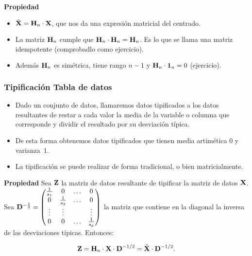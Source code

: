 \begin{frame}
\textbf{Propiedad}
\begin{itemize}
\item $\tilde{\mathbf{X}}=\mathbf{H}_n\cdot \mathbf{X}$, que nos da una expresión matricial del centrado.
\item La matriz $\mathbf{H}_n$ cumple que $\mathbf{H}_n\cdot \mathbf{H}_n = \mathbf{H}_n$.  Es lo que se llama una matriz idempotente (comprobadlo como ejercicio).
\item  Además $\mathbf{H}_n$ es simétrica, tiene rango $n-1$ y $\mathbf{H}_n \cdot \mathbf{1}_n=0$ (ejercicio).
\end{itemize}
\end{frame}
\begin{frame}
\frametitle{Tipificación Tabla de datos}
\begin{itemize}
\item Dado un conjunto de datos, llamaremos datos tipificados  a los datos resultantes de restar a cada valor la media de la variable o columna que corresponde y dividir el resultado por su desviación típica. 
\item De esta forma obtenemos datos tipificados que tienen media artimética $0$ y varianza~$1$.
\item La tipificación se puede realizar de forma tradicional, o bien matricialmente. 
\end{itemize}
\end{frame}

\begin{frame}
\textbf{Propiedad}
Sea $\mathbf{Z}$ la matriz de datos resultante de tipificar la matriz de datos $\mathbf{X}$. Sea 
$
\mathbf{D}^{-\frac{1}{2}}=
\begin{pmatrix} 
\frac{1}{s_1} & 0 & \ldots & 0\\
 0 & \frac{1}{s_2}  & \ldots & 0\\
 \vdots & \vdots & & \vdots\\
 0 & 0 & \ldots  & \frac{1}{s_p}
\end{pmatrix}
$
la matriz que contiene en la diagonal la inversa de las desviaciones típicas. Entonces:

$$\mathbf{Z}=\mathbf{H}_n\cdot \mathbf{X}\cdot \mathbf{D}^{-1/2}=\tilde{\mathbf{X}}\cdot \mathbf{D}^{-1/2}.$$

\end{frame}

